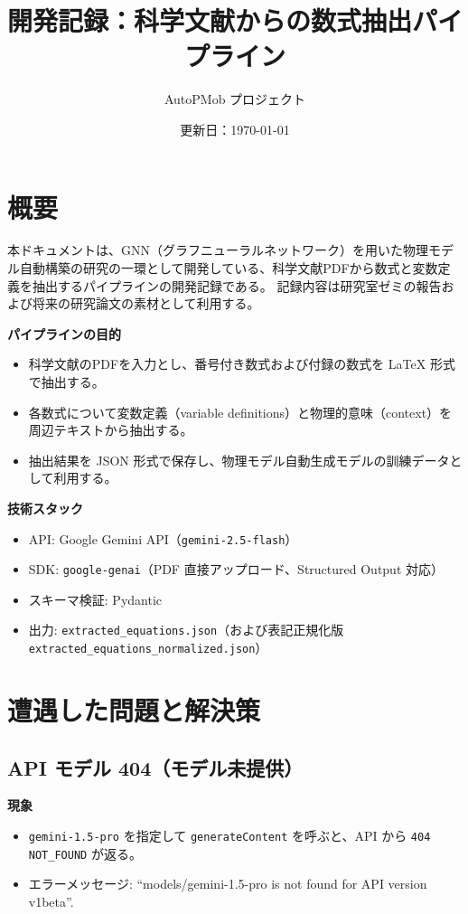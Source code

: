 \documentclass[11pt,a4paper]{jsarticle}
\title{開発記録：科学文献からの数式抽出パイプライン}
\author{AutoPMob プロジェクト}
\date{更新日：\today}
\begin{document}
\maketitle
\tableofcontents
\clearpage

\section{概要}
本ドキュメントは、GNN（グラフニューラルネットワーク）を用いた物理モデル自動構築の研究の一環として開発している、科学文献PDFから数式と変数定義を抽出するパイプラインの開発記録である。
記録内容は研究室ゼミの報告および将来の研究論文の素材として利用する。

\textbf{パイプラインの目的}
\begin{itemize}[nosep]
  \item 科学文献のPDFを入力とし、番号付き数式および付録の数式を LaTeX 形式で抽出する。
  \item 各数式について変数定義（variable definitions）と物理的意味（context）を周辺テキストから抽出する。
  \item 抽出結果を JSON 形式で保存し、物理モデル自動生成モデルの訓練データとして利用する。
\end{itemize}

\textbf{技術スタック}
\begin{itemize}[nosep]
  \item API: Google Gemini API（\texttt{gemini-2.5-flash}）
  \item SDK: \texttt{google-genai}（PDF 直接アップロード、Structured Output 対応）
  \item スキーマ検証: Pydantic
  \item 出力: \texttt{extracted\_equations.json}（および表記正規化版 \texttt{extracted\_equations\_normalized.json}）
\end{itemize}

\section{遭遇した問題と解決策}

\subsection{API モデル 404（モデル未提供）}
\textbf{現象}
\begin{itemize}[nosep]
  \item \texttt{gemini-1.5-pro} を指定して \texttt{generateContent} を呼ぶと、API から \texttt{404 NOT\_FOUND} が返る。
  \item エラーメッセージ: ``models/gemini-1.5-pro is not found for API version v1beta''.
\end{itemize}
\end{document}
